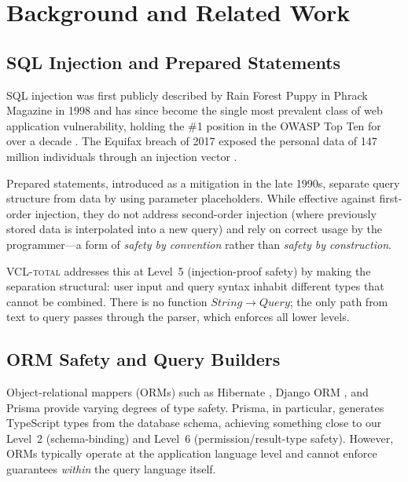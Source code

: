 \documentclass[11pt,a4paper]{article}
\newcommand{\VCL}{\textsc{VCL-total}}
\begin{document}
\section{Background and Related Work}\label{sec:background}

\subsection{SQL Injection and Prepared Statements}

SQL injection was first publicly described by Rain Forest Puppy in
Phrack Magazine in 1998 \citep{rfp1998nt} and has since become the
single most prevalent class of web application vulnerability, holding
the \#1 position in the OWASP Top Ten for over a decade
\citep{owasp2021top10}.  The Equifax breach of 2017 exposed the
personal data of 147 million individuals through an injection vector
\citep{usgao2018equifax}.

Prepared statements, introduced as a mitigation in the late 1990s,
separate query structure from data by using parameter placeholders.
While effective against first-order injection, they do not address
second-order injection (where previously stored data is interpolated
into a new query) and rely on correct usage by the programmer---a form
of \emph{safety by convention} rather than \emph{safety by
construction}.

\VCL{} addresses this at Level~5 (injection-proof safety) by making
the separation structural: user input and query syntax inhabit
different types that cannot be combined.  There is no function
$\mathit{String} \to \mathit{Query}$; the only path from text to query
passes through the parser, which enforces all lower levels.

\subsection{ORM Safety and Query Builders}

Object-relational mappers (ORMs) such as Hibernate \citep{bauer2015java},
Django ORM \citep{holovaty2009django}, and Prisma
\citep{prisma2023docs} provide varying degrees of type safety.
Prisma, in particular, generates TypeScript types from the database
schema, achieving something close to our Level~2 (schema-binding) and
Level~6 (permission/result-type safety).  However, ORMs typically
operate at the application language level and cannot enforce
guarantees \emph{within} the query language itself.
\end{document}

